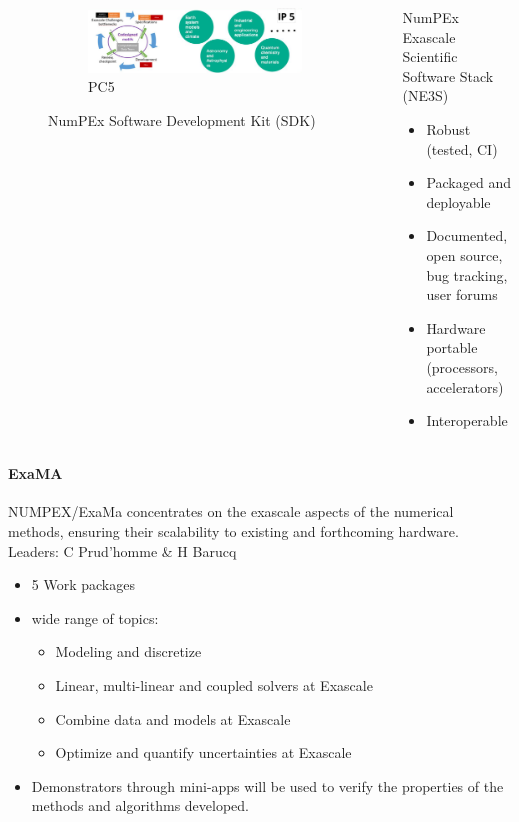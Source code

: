 \begin{frame}
\begin{columns}[t]
\begin{column}{.5\textwidth}
\begin{figure}[ht]
\begin{subfigure}{.9\textwidth}
            \includegraphics[width=\textwidth]{../figures/numpex-ip5-1.png}
            \caption{PC5}
          \end{subfigure}
         \caption{NumPEx Software Development Kit (SDK)}%
         \label{some-label}%
        \end{figure}
    \end{column}
    \begin{column}{0.5\textwidth}
       \begin{alertblock}{NumPEx Exascale Scientific Software Stack (NE3S)}
         \begin{itemize}
           \item Robust (tested, CI)
           \item Packaged and deployable
           \item Documented, open source, bug          tracking, user forums
           \item Hardware portable (processors,  accelerators)
           \item Interoperable
         \end{itemize}
       \end{alertblock}
    \end{column}
    
    \end{columns}


\end{frame}
\begin{frame}{\insertsectionhead}
  \framesubtitle{ExaMA}
  NUMPEX/ExaMa concentrates on the exascale aspects of the numerical methods, ensuring their scalability to existing and forthcoming hardware.
  \vfill
  Leaders: C Prud'homme \& H Barucq
  \begin{itemize}
    \item 5 Work packages
    \item wide range of topics: 
    \begin{itemize}
        \item Modeling and discretize
        \item Linear, multi-linear and coupled solvers at Exascale
        \item Combine data and  models at Exascale
        \item Optimize and quantify uncertainties at Exascale
    \end{itemize}
    \item Demonstrators through mini-apps will be used to verify the properties of the methods and algorithms developed.
  \end{itemize}
\end{frame}

